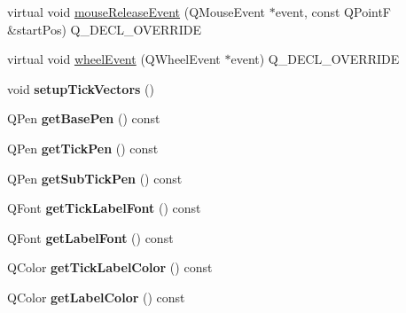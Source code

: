 \begin{DoxyCompactItemize}
\item 
virtual void \hyperlink{classQCPAxis_a780bee321fc6476e5fc49c4980291a01}{mouse\+Release\+Event} (Q\+Mouse\+Event $\ast$event, const Q\+PointF \&start\+Pos) Q\+\_\+\+D\+E\+C\+L\+\_\+\+O\+V\+E\+R\+R\+I\+DE
\item 
virtual void \hyperlink{classQCPAxis_aa850f195d7cc470c53809d0fff5e444d}{wheel\+Event} (Q\+Wheel\+Event $\ast$event) Q\+\_\+\+D\+E\+C\+L\+\_\+\+O\+V\+E\+R\+R\+I\+DE
\item 
\mbox{\label{classQCPAxis_a57d9e961bae7d62f5b4e1f143e660c78}} 
void {\bfseries setup\+Tick\+Vectors} ()
\item 
\mbox{\label{classQCPAxis_a8cd3764c6a4ce9c3d7d913e81cad0a50}} 
Q\+Pen {\bfseries get\+Base\+Pen} () const
\item 
\mbox{\label{classQCPAxis_afe7d57415cbbf31e5549a5cc40b6f8d8}} 
Q\+Pen {\bfseries get\+Tick\+Pen} () const
\item 
\mbox{\label{classQCPAxis_aad7739c229b292ddab0b3a43a5676f54}} 
Q\+Pen {\bfseries get\+Sub\+Tick\+Pen} () const
\item 
\mbox{\label{classQCPAxis_a694ab8b4240f3c90a866372e3dcb364f}} 
Q\+Font {\bfseries get\+Tick\+Label\+Font} () const
\item 
\mbox{\label{classQCPAxis_aeac21c907d2516af9cde9a463043d671}} 
Q\+Font {\bfseries get\+Label\+Font} () const
\item 
\mbox{\label{classQCPAxis_a8d00d5b78ecfbebbea5a8161bddb9a17}} 
Q\+Color {\bfseries get\+Tick\+Label\+Color} () const
\item 
\mbox{\label{classQCPAxis_ae914abd56afa570cb9f2ab50e59c0f0e}} 
Q\+Color {\bfseries get\+Label\+Color} () const
\end{DoxyCompactItemize}
